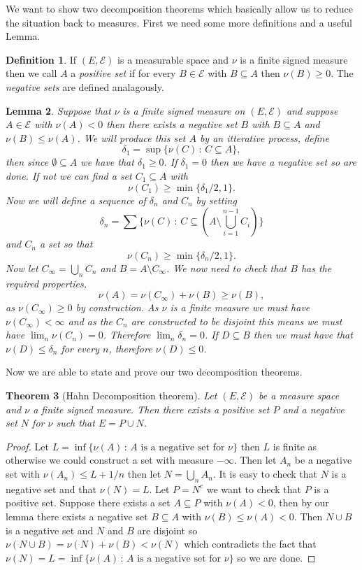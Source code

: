 \documentclass[11pt]{article}
\newtheorem{thm}{Theorem}[section]
\newtheorem{lem}[thm]{Lemma}
\theoremstyle{definition}
\newtheorem{dfn}[thm]{Definition}
\theoremstyle{remark}
\begin{document}
We want to show two decomposition theorems which basically allow us to reduce the situation back to measures. First we need some more definitions and a useful Lemma.
\begin{dfn}
If $(E, \mathcal{E})$ is a measurable space and $\nu$ is a finite signed measure then we call $A$ a \emph{positive set} if for every $B \in \mathcal{E}$ with $B \subseteq A$ then $\nu(B) \geq 0$. The \emph{negative sets} are defined analagously.
\end{dfn}
\begin{lem}
Suppose that $\nu$ is a finite signed measure on $(E, \mathcal{E})$ and suppose $A \in \mathcal{E}$ with $\nu(A) <0$ then there exists a negative set $B$ with $B \subseteq A$ and $\nu(B) \leq \nu(A)$. We will produce this set $A$ by an itterative process, define
\[ \delta_1 = \sup \{ \nu(C) \,:\, C \subseteq A\}, \] then since $\emptyset \subseteq A$ we have that $\delta_1 \geq 0$. If $\delta_1 = 0$ then we have a negative set so are done. If not we can find a set $C_1 \subseteq A$ with 
\[ \nu(C_1) \geq \min\{\delta_1/2 ,1\}. \] Now we will define a sequence of $\delta_n$ and $C_n$ by setting
\[ \delta_n = \sum\{ \nu(C) \,:\, C \subseteq (A \setminus \bigcup_{i=1}^{n-1}C_i)\} \] and $C_n$ a set so that 
\[ \nu(C_n) \geq \min\{ \delta_n /2 ,1\}. \] Now let $C_\infty = \bigcup_n C_n$ and $B = A \setminus C_\infty$. We now need to check that $B$ has the required properties,
\[ \nu(A) = \nu(C_\infty) + \nu(B) \geq \nu(B), \] as $\nu(C_\infty) \geq 0$ by construction.
As $\nu$ is a finite measure we must have $\nu(C_\infty) < \infty$ and as the $C_n$ are constructed to be disjoint this means we must have $\lim_n \nu(C_n) = 0$. Therefore $\lim_n \delta_n = 0$. If $D \subseteq B$ then we must have that $\nu(D) \leq \delta_n$ for every $n$, therefore $\nu(D) \leq 0$.
\end{lem}

Now we are able to state and prove our two decomposition theorems.
\begin{thm}[Hahn Decomposition theorem]
Let $(E, \mathcal{E})$ be a measure space and $\nu$ a finite signed measure. Then there exists a positive set $P$ and a negative set $N$ for $\nu$ such that $E = P \cup N$.
\end{thm}
\begin{proof}
Let $L = \inf\{ \nu(A)\,:\, \mbox{$A$ is a negative set for $\nu$}\}$ then $L$ is finite as otherwise we could construct a set with measure $-\infty$. Then let $A_n$ be a negative set with $\nu(A_n) \leq L+1/n$ then let $N = \bigcup_n A_n$. It is easy to check that $N$ is a negative set and that $\nu(N) = L$. Let $P = N^c$ we want to check that $P$ is a positive set. Suppose there exists a set $A \subseteq P$ with $\nu(A) < 0$, then by our lemma there exists a negative set $B \subseteq A$ with $\nu(B) \leq \nu(A)<0$. Then $N \cup B$ is a negative set and $N$ and $B$ are disjoint so $\nu(N \cup B) = \nu(N) + \nu(B) < \nu(N)$ which contradicts the fact that $\nu(N) = L = \inf\{ \nu(A)\,:\, \mbox{$A$ is a negative set for $\nu$}\}$ so we are done.
\end{proof}
\end{document}
